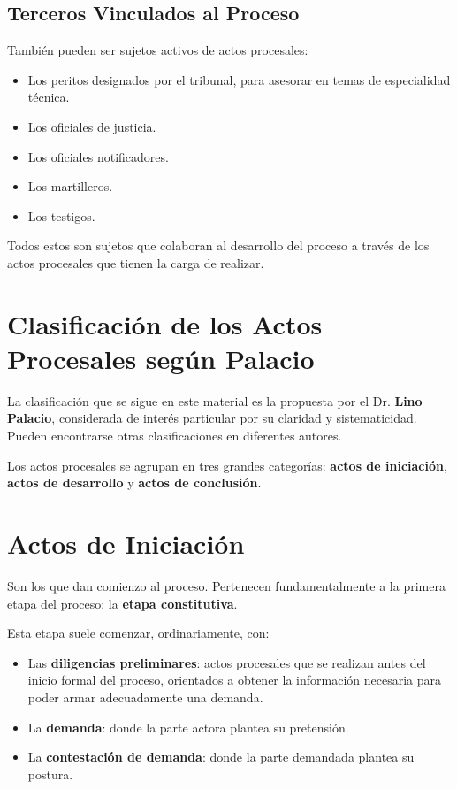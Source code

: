 \documentclass[12pt,oneside]{book}
\begin{document}
\subsection{Terceros Vinculados al Proceso}

También pueden ser sujetos activos de actos procesales:

\begin{itemize}
    \item Los peritos designados por el tribunal, para asesorar en temas de especialidad técnica.
    \item Los oficiales de justicia.
    \item Los oficiales notificadores.
    \item Los martilleros.
    \item Los testigos.
\end{itemize}

Todos estos son sujetos que colaboran al desarrollo del proceso a través de los actos procesales que tienen la carga de realizar.

\section{Clasificación de los Actos Procesales según Palacio}

La clasificación que se sigue en este material es la propuesta por el Dr. \textbf{Lino Palacio}, considerada de interés particular por su claridad y sistematicidad. Pueden encontrarse otras clasificaciones en diferentes autores.

Los actos procesales se agrupan en tres grandes categorías: \textbf{actos de iniciación}, \textbf{actos de desarrollo} y \textbf{actos de conclusión}.

\section{Actos de Iniciación}

Son los que dan comienzo al proceso. Pertenecen fundamentalmente a la primera etapa del proceso: la \textbf{etapa constitutiva}.

Esta etapa suele comenzar, ordinariamente, con:

\begin{itemize}
    \item Las \textbf{diligencias preliminares}: actos procesales que se realizan antes del inicio formal del proceso, orientados a obtener la información necesaria para poder armar adecuadamente una demanda.
    \item La \textbf{demanda}: donde la parte actora plantea su pretensión.
    \item La \textbf{contestación de demanda}: donde la parte demandada plantea su postura.
\end{itemize}
\end{document}
